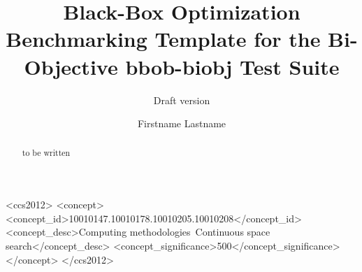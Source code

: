 \documentclass[sigconf]{acmart}
\newcommand{\bbobbiobj}{{\ttfamily bbob-biobj}\xspace}
\begin{document}
\title{Black-Box Optimization Benchmarking Template for the Bi-Objective \bbobbiobj Test Suite}
\renewcommand{\shorttitle}{Template for Benchmarking Single Algorithms on the \bbobbiobj Testbed}
\subtitle{Draft version}



\author{Firstname Lastname}
%
%
%
%
%
%
%

\renewcommand{\shortauthors}{Firstname Lastname et. al.}


\begin{abstract}
to be written
\end{abstract}


%
%
 \begin{CCSXML}
<ccs2012>
<concept>
<concept_id>10010147.10010178.10010205.10010208</concept_id>
<concept_desc>Computing methodologies~Continuous space search</concept_desc>
<concept_significance>500</concept_significance>
</concept>
</ccs2012>
\end{CCSXML}
\end{document}
